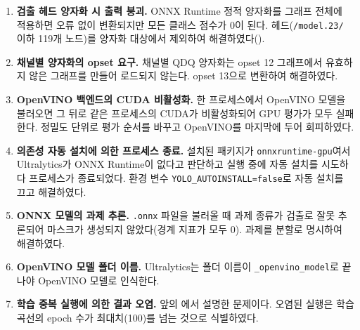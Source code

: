 \begin{enumerate}
  \item \textbf{검출 헤드 양자화 시 출력 붕괴.} ONNX Runtime 정적 양자화를 그래프 전체에 적용하면 오류 없이
    변환되지만 모든 클래스 점수가 0이 된다. 헤드(\texttt{/model.23/} 이하 119개 노드)를 양자화 대상에서
    제외하여 해결하였다().
  \item \textbf{채널별 양자화의 opset 요구.} 채널별 QDQ 양자화는 opset 12 그래프에서 유효하지 않은 그래프를
    만들어 로드되지 않는다. opset 13으로 변환하여 해결하였다.
  \item \textbf{OpenVINO 백엔드의 CUDA 비활성화.} 한 프로세스에서 OpenVINO 모델을 불러오면 그 뒤로 같은
    프로세스의 CUDA가 비활성화되어 GPU 평가가 모두 실패한다. 정밀도 단위로 평가 순서를 바꾸고 OpenVINO를
    마지막에 두어 회피하였다.
  \item \textbf{의존성 자동 설치에 의한 프로세스 종료.} 설치된 패키지가 \texttt{onnxruntime-gpu}여서 Ultralytics가
    ONNX Runtime이 없다고 판단하고 실행 중에 자동 설치를 시도하다 프로세스가 종료되었다. 환경 변수
    \texttt{YOLO\_AUTOINSTALL=false}로 자동 설치를 끄고 해결하였다.
  \item \textbf{ONNX 모델의 과제 추론.} \texttt{.onnx} 파일을 불러올 때 과제 종류가 검출로 잘못 추론되어
    마스크가 생성되지 않았다(경계 지표가 모두 0). 과제를 분할로 명시하여 해결하였다.
  \item \textbf{OpenVINO 모델 폴더 이름.} Ultralytics는 폴더 이름이 \texttt{\_openvino\_model}로 끝나야
    OpenVINO 모델로 인식한다.
  \item \textbf{학습 중복 실행에 의한 결과 오염.} 앞의 에서 설명한 문제이다. 오염된 실행은
    학습 곡선의 epoch 수가 최대치(100)를 넘는 것으로 식별하였다.
\end{enumerate}
